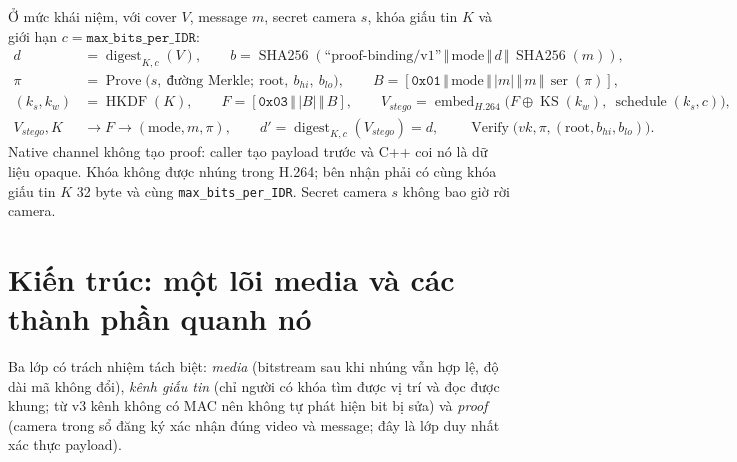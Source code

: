 \documentclass[10pt,a4paper]{article}
\begin{document}
Ở mức khái niệm, với cover $V$, message $m$, secret camera $s$, khóa giấu tin $K$ và giới hạn $c=\texttt{max\_bits\_per\_IDR}$:
\[
  \begin{aligned}
  d &= \operatorname{digest}_{K,c}(V),\qquad b=\operatorname{SHA256}(\text{``proof-binding/v1''}\,\Vert\,\text{mode}\,\Vert\,d\,\Vert\,\operatorname{SHA256}(m)),\\
  \pi &= \operatorname{Prove}\bigl(s,\ \text{đường Merkle};\ \text{root},\ b_{hi},\ b_{lo}\bigr),\qquad B=[\texttt{0x01}\,\Vert\,\text{mode}\,\Vert\,|m|\,\Vert\,m\,\Vert\,\operatorname{ser}(\pi)],\\
  (k_s,k_w) &= \operatorname{HKDF}(K),\qquad F=[\texttt{0x03}\,\Vert\,|B|\,\Vert\,B],\qquad V_{stego} = \operatorname{embed}_{H.264}\bigl(F\oplus\operatorname{KS}(k_w),\ \operatorname{schedule}(k_s,c)\bigr),\\
  V_{stego},K &\longrightarrow F \longrightarrow (\text{mode},m,\pi),\qquad d'=\operatorname{digest}_{K,c}(V_{stego})=d,\qquad \operatorname{Verify}\bigl(vk,\pi,(\text{root},b_{hi},b_{lo})\bigr).
  \end{aligned}
\]
Native channel không tạo proof: caller tạo payload trước và C++ coi nó là dữ liệu opaque. Khóa không được nhúng trong H.264; bên nhận phải có cùng khóa giấu tin $K$ 32 byte và cùng \texttt{max\_bits\_per\_IDR}. Secret camera $s$ không bao giờ rời camera.

\section{Kiến trúc: một lõi media và các thành phần quanh nó}

Ba lớp có trách nhiệm tách biệt: \emph{media} (bitstream sau khi nhúng vẫn hợp lệ, độ dài mã không đổi), \emph{kênh giấu tin} (chỉ người có khóa tìm được vị trí và đọc được khung; từ v3 kênh không có MAC nên không tự phát hiện bit bị sửa) và \emph{proof} (camera trong sổ đăng ký xác nhận đúng video và message; đây là lớp duy nhất xác thực payload).
\end{document}
